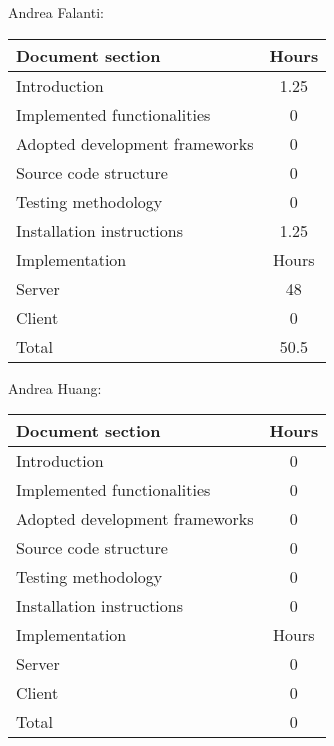Andrea Falanti:

\begin{tabular}{|l|c|}
    \hline
    Document section & Hours\\
    \hline
     Introduction & 1.25\\
     Implemented functionalities & 0\\
     Adopted development frameworks & 0\\
     Source code structure & 0\\
     Testing methodology & 0\\
     Installation instructions & 1.25\\
     \hline
     Implementation & Hours \\
     \hline
     Server & 48\\
     Client & 0\\
     \hline
     Total & 50.5\\
     \hline
\end{tabular}

\vskip 0.3in

Andrea Huang:

\begin{tabular}{|l|c|}
    \hline
    Document section & Hours \\
    \hline
     Introduction & 0\\
     Implemented functionalities & 0\\
     Adopted development frameworks & 0\\
     Source code structure & 0\\
     Testing methodology & 0\\
     Installation instructions & 0\\
     \hline
     Implementation & Hours \\
     \hline
     Server & 0\\
     Client & 0\\
     \hline
     Total & 0\\
     \hline
\end{tabular}